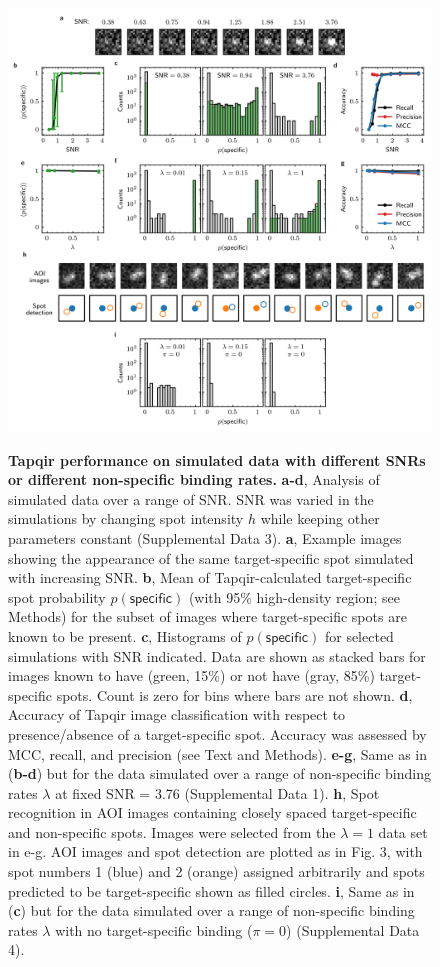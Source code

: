 \begin{figure}[htbp]
\centering
\includegraphics[width=1\textwidth]{figures/figure5.png}
\end{figure}
\begin{figure} [htbp]
\caption{\textbf{Tapqir performance on simulated data with different SNRs or different non-specific binding rates.} \textbf{a-d}, Analysis of simulated data over a range of SNR. SNR was varied in the simulations by changing spot intensity  $h$ while keeping other parameters constant (Supplemental Data 3). \textbf{a}, Example images showing the appearance of the same target-specific spot simulated with increasing SNR.   \textbf{b}, Mean of Tapqir-calculated target-specific spot probability $p(\mathsf{specific})$ (with 95\% high-density region; see Methods) for the subset of images where target-specific spots  are known to be present. \textbf{c}, Histograms of $p(\mathsf{specific})$ for selected simulations with SNR indicated. Data are shown as stacked bars for images known to have (green, 15\%) or not have (gray, 85\%) target-specific spots.  Count is zero for bins where bars are not shown. \textbf{d}, Accuracy of Tapqir image classification with respect to presence/absence of a target-specific spot. Accuracy was assessed by MCC, recall, and precision (see Text and Methods). \textbf{e-g}, Same as in (\textbf{b-d}) but for the data simulated over a range of non-specific binding rates $\lambda$ at fixed SNR = 3.76 (Supplemental Data 1). \textbf{h}, Spot recognition in AOI images containing closely spaced target-specific and non-specific spots.  Images were selected from the $\lambda = 1$ data set in e-g. AOI images and spot detection are plotted as in Fig. 3, with spot numbers 1 (blue) and 2 (orange) assigned arbitrarily and spots predicted to be target-specific shown as filled circles. \textbf{i}, Same as in (\textbf{c}) but for the data simulated over a range of non-specific binding rates $\lambda$ with no target-specific binding ($\pi = 0$) (Supplemental Data 4).}
\label{fig:tapqir_performance}
\end{figure}

